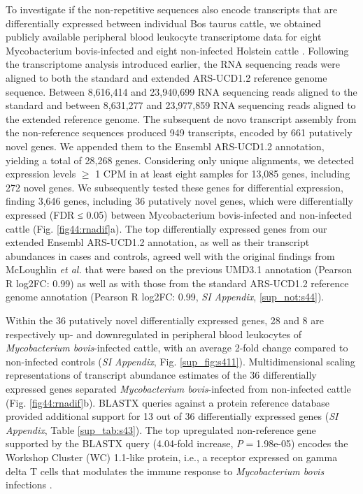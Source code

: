 \documentclass[../main.tex]{subfiles}
\begin{document}
To investigate if the non-repetitive sequences also encode transcripts that are differentially expressed between individual Bos taurus cattle, we obtained publicly available peripheral blood leukocyte transcriptome data for eight Mycobacterium bovis-infected and eight non-infected Holstein cattle \citep{mcloughlin2014rna}. Following the transcriptome analysis introduced earlier, the RNA sequencing reads were aligned to both the standard and extended ARS-UCD1.2 reference genome sequence. Between 8,616,414 and 23,940,699 RNA sequencing reads aligned to the standard and between 8,631,277 and 23,977,859 RNA sequencing reads aligned to the extended reference genome. The subsequent de novo transcript assembly from the non-reference sequences produced 949 transcripts, encoded by 661 putatively novel genes. We appended them to the Ensembl ARS-UCD1.2 annotation, yielding a total of 28,268 genes. Considering only unique alignments, we detected expression levels $≥$ 1 CPM in at least eight samples for 13,085 genes, including 272 novel genes. We subsequently tested these genes for differential expression, finding 3,646 genes, including 36 putatively novel genes, which were differentially expressed (FDR ≤ 0.05) between Mycobacterium bovis-infected and non-infected cattle (Fig. \ref{fig44:rnadif}a). The top differentially expressed genes from our extended Ensembl ARS-UCD1.2 annotation, as well as their transcript abundances in cases and controls, agreed well with the original findings from McLoughlin \emph{et al.} that were based on the previous UMD3.1 annotation (Pearson R log2FC: 0.99) as well as with those from the standard ARS-UCD1.2 reference genome annotation (Pearson R log2FC: 0.99, \emph{SI Appendix}, \ref{sup_not:s44}). 


Within the 36 putatively novel differentially expressed genes, 28 and 8 are respectively up- and downregulated in peripheral blood leukocytes of \emph{Mycobacterium bovis}-infected cattle, with an average 2-fold change compared to non-infected controls (\emph{SI Appendix}, Fig. \ref{sup_fig:s411}). Multidimensional scaling representations of transcript abundance estimates of the 36 differentially expressed genes separated \emph{Mycobacterium bovis}-infected from non-infected cattle (Fig. \ref{fig44:rnadif}b). BLASTX queries against a protein reference database provided additional support for 13 out of 36 differentially expressed genes (\emph{SI Appendix}, Table \ref{sup_tab:s43}). The top upregulated non-reference gene supported by the BLASTX query (4.04-fold increase, \emph{P}$=$1.98e-05) encodes the Workshop Cluster (WC) 1.1-like protein, i.e., a receptor expressed on gamma delta T cells that modulates the immune response to \emph{Mycobacterium bovis} infections \citep{mcgill2014specific,damani2018variegated,kennedy2002modulation}. 
\end{document}
